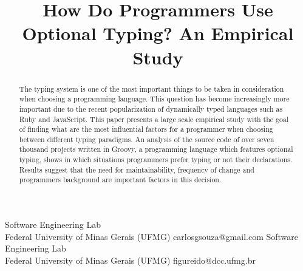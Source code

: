 \documentclass[preprint]{sigplanconf}
\begin{document}
\setlength{\pdfpageheight}{\paperheight}
\setlength{\pdfpagewidth}{\paperwidth}






\title{How Do Programmers Use Optional Typing? An Empirical Study}

           {Software Engineering Lab\\Federal University of Minas Gerais (UFMG)}
           {carlosgsouza@gmail.com}
           {Software Engineering Lab\\Federal University of Minas Gerais (UFMG)}
           {figureido@dcc.ufmg.br}

\maketitle

\begin{abstract}
The typing system is one of the most important things to be taken in consideration when choosing a programming language. 
This question has become increasingly more important due to the recent popularization of dynamically typed languages such as Ruby and JavaScript. 
This paper presents a large scale empirical study with the goal of finding what are the most influential factors for a programmer when choosing between different typing paradigms. 
An analysis of the source code of over seven thousand projects written in Groovy, a programming language which features optional typing, shows in which situations programmers prefer typing or not their declarations. 
Results suggest that the need for maintainability, frequency of change and programmers background are important factors in this decision.
\end{abstract}
\end{document}
